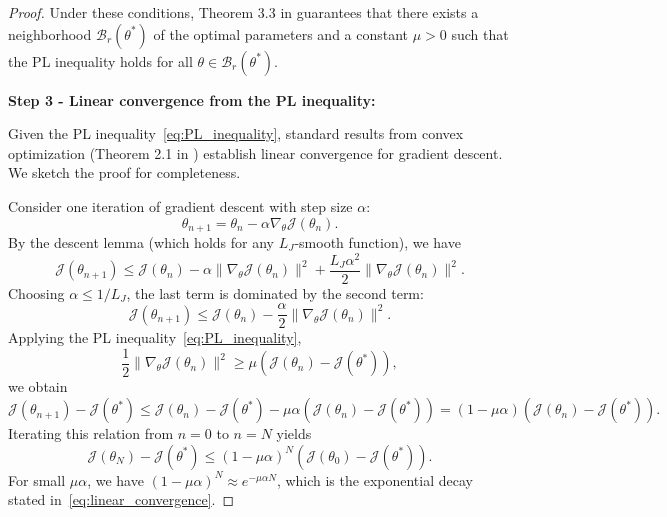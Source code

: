\documentclass[11pt,reqno]{amsart}
\theoremstyle{plain}
\theoremstyle{definition}
\theoremstyle{remark}
\begin{document}
\begin{proof}
Under these conditions, Theorem 3.3 in \cite{wang2022and} guarantees that there exists a neighborhood $\mathcal{B}_r(\theta^*)$ of the optimal parameters and a constant $\mu > 0$ such that the PL inequality holds for all $\theta \in \mathcal{B}_r(\theta^*)$.

\medskip
\noindent\textbf{Step 3 - Linear convergence from the PL inequality:}

\noindent Given the PL inequality~\eqref{eq:PL_inequality}, standard results from convex optimization (Theorem 2.1 in \cite{karimi2016linear}) establish linear convergence for gradient descent. We sketch the proof for completeness.

\noindent Consider one iteration of gradient descent with step size $\alpha$:
\begin{equation}
    \theta_{n+1} = \theta_n - \alpha \nabla_\theta \mathcal{J}(\theta_n).
\end{equation}
By the descent lemma (which holds for any $L_J$-smooth function), we have
\begin{equation}
    \mathcal{J}(\theta_{n+1}) \leq \mathcal{J}(\theta_n) - \alpha \|\nabla_\theta \mathcal{J}(\theta_n)\|^2 + \frac{L_J \alpha^2}{2} \|\nabla_\theta \mathcal{J}(\theta_n)\|^2.
\end{equation}
Choosing $\alpha \leq 1/L_J$, the last term is dominated by the second term:
\begin{equation}
    \mathcal{J}(\theta_{n+1}) \leq \mathcal{J}(\theta_n) - \frac{\alpha}{2} \|\nabla_\theta \mathcal{J}(\theta_n)\|^2.
\end{equation}
Applying the PL inequality~\eqref{eq:PL_inequality},
\begin{equation}
    \frac{1}{2}\|\nabla_\theta \mathcal{J}(\theta_n)\|^2 \geq \mu (\mathcal{J}(\theta_n) - \mathcal{J}(\theta^*)),
\end{equation}
we obtain
\begin{equation}
    \mathcal{J}(\theta_{n+1}) - \mathcal{J}(\theta^*) \leq \mathcal{J}(\theta_n) - \mathcal{J}(\theta^*) - \mu\alpha (\mathcal{J}(\theta_n) - \mathcal{J}(\theta^*)) = (1 - \mu\alpha)(\mathcal{J}(\theta_n) - \mathcal{J}(\theta^*)).
\end{equation}
Iterating this relation from $n=0$ to $n=N$ yields
\begin{equation}
    \mathcal{J}(\theta_N) - \mathcal{J}(\theta^*) \leq (1 - \mu\alpha)^N (\mathcal{J}(\theta_0) - \mathcal{J}(\theta^*)).
\end{equation}
For small $\mu\alpha$, we have $(1 - \mu\alpha)^N \approx e^{-\mu\alpha N}$, which is the exponential decay stated in~\eqref{eq:linear_convergence}.


\end{proof}
\end{document}
